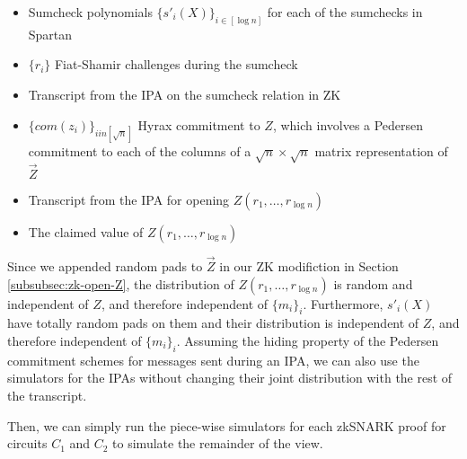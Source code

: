 \begin{itemize}
    \item Sumcheck polynomials $\{s'_i(X)\}_{i \in [\log n]}$ for each of the sumchecks in Spartan
    \item $\{r_i\}$ Fiat-Shamir challenges during the sumcheck
    \item Transcript from the IPA on the sumcheck relation in ZK
    \item $\{com(z_i)\}_{i in [\sqrt{n}]}$ Hyrax commitment to $Z$, which involves a Pedersen commitment to each of the columns of a $\sqrt{n} \times \sqrt{n}$ matrix representation of $\vec{Z}$
    \item Transcript from the IPA for opening $Z(r_1, \dots, r_{\log n})$
    \item The claimed value of $Z(r_1, \dots, r_{\log n})$
\end{itemize}

Since we appended random pads to $\vec{Z}$ in our ZK modifiction in Section \ref{subsubsec:zk-open-Z}, the distribution of $Z(r_1, \dots, r_{\log n})$ is random and independent of $Z$, and therefore independent of $\{m_i\}_i$.
Furthermore, $s'_i(X)$ have totally random pads on them and their distribution is independent of $Z$, and therefore independent of $\{m_i\}_i$.
Assuming the hiding property of the Pedersen commitment schemes for messages sent during an IPA, we can also use the simulators for the IPAs without changing their joint distribution with the rest of the transcript.

Then, we can simply run the piece-wise simulators for each zkSNARK proof for circuits $C_1$ and $C_2$ to simulate the remainder of the view. 


